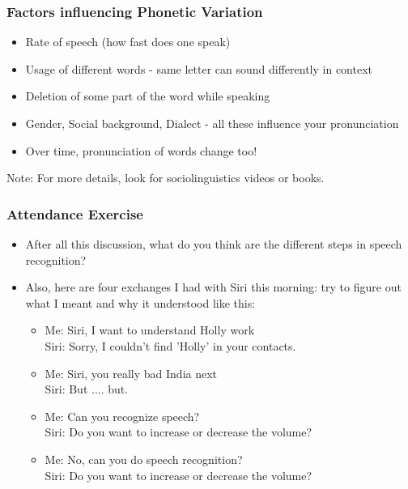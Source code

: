 \documentclass{beamer}
\begin{document}
\begin{frame}
\frametitle{Factors influencing Phonetic Variation}
\begin{itemize}
\item Rate of speech (how fast does one speak)
\item Usage of different words - same letter can sound differently in context
\item Deletion of some part of the word while speaking
\item Gender, Social background, Dialect - all these influence your pronunciation
\item Over time, pronunciation of words change too!
\end{itemize}
Note: For more details, look for sociolinguistics videos or books. 
\end{frame}

\begin{frame}
\frametitle{Attendance Exercise}
\begin{itemize}
\item After all this discussion, what do you think are the different steps in speech recognition?
\item Also, here are four exchanges I had with Siri this morning: try to figure out what I meant and why it understood like this: 
\begin{itemize}
\item Me: Siri, I want to understand Holly work \\
Siri: Sorry, I couldn't find 'Holly' in your contacts.
\item Me: Siri, you really bad India next \\
Siri: But .... but.
\item Me: Can you recognize speech? \\
Siri: Do you want to increase or decrease the volume?
\item Me: No, can you do speech recognition? \\
Siri: Do you want to increase or decrease the volume?
\end{itemize}
\end{itemize}
\end{frame}
\end{document}
